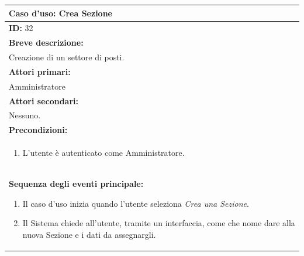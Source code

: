 \documentclass{article}
\begin{document}
                \begin{table}[H]
                    \begin{tabular}{|p{\linewidth}|}
                        \hline
                        \cellcolor{gray!100}
                        \color{white}
                        \centerline{\textbf{Caso d'uso:} Crea Sezione} \\
                        \hline
                        \textbf{ID:} 32 \\
                        \hline
                        \cellcolor{gray!20}
                        \textbf{Breve descrizione:} \\
                        \cellcolor{gray!20}
                        Creazione di un settore di posti. \\
                        \hline
                        \textbf{Attori primari:} \\
                        \begin{minipage}{\linewidth}
                            Amministratore
                        \end{minipage}
                        \vspace{-10pt} \\ 
                        \hline
                        \textbf{Attori secondari:} \\
                        Nessuno. \\
                        \hline
                        \cellcolor{gray!20}
                        \textbf{Precondizioni:} \\
                        \cellcolor{gray!20}
                        \begin{minipage}{\linewidth}
                            \begin{enumerate}
                                \item L'utente è autenticato come Amministratore.
                            \end{enumerate}
                        \end{minipage} \\
                        \hline
                        \textbf{Sequenza degli eventi principale:}
                        \begin{enumerate}
                            \item Il caso d'uso inizia quando l'utente seleziona \textit{Crea una Sezione}.
                            \item Il Sistema chiede all'utente, tramite un interfaccia, come che nome dare alla nuova Sezione e i dati da assegnargli.

\end{enumerate}
\end{tabular}
\end{table}
\end{document}
